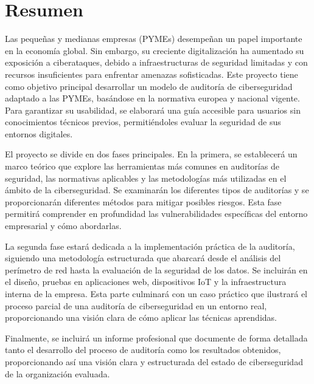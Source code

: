 \documentclass[a4paper, 10pt]{article}
\begin{document}

\section*{Resumen}
\thispagestyle{empty}
Las pequeñas y medianas empresas (PYMEs) desempeñan un papel importante en la economía global. Sin embargo, su creciente
digitalización ha aumentado su exposición a ciberataques, debido a infraestructuras de seguridad limitadas y con recursos insuficientes para enfrentar amenazas sofisticadas. 
Este proyecto tiene como objetivo principal desarrollar un modelo de auditoría de ciberseguridad adaptado a las PYMEs, basándose en la normativa europea y nacional vigente. Para garantizar su usabilidad, se elaborará una guía accesible para usuarios sin conocimientos técnicos previos, permitiéndoles evaluar la seguridad de sus entornos digitales.
\par\vspace{0.5cm}

El proyecto se divide en dos fases principales. En la primera, se establecerá un marco teórico que explore las herramientas más comunes en auditorías de seguridad, las normativas aplicables y las metodologías más utilizadas en el ámbito de la ciberseguridad. Se examinarán los diferentes tipos de auditorías y se proporcionarán diferentes métodos para mitigar posibles riesgos. Esta fase permitirá comprender en profundidad las vulnerabilidades específicas del entorno empresarial y cómo abordarlas.
\par\vspace{0.5cm}

La segunda fase estará dedicada a la implementación práctica de la auditoría, siguiendo una 
metodología estructurada que abarcará desde el análisis del perímetro de red hasta la evaluación de la seguridad de los datos. 
Se incluirán en el diseño, pruebas en aplicaciones web, dispositivos IoT y la infraestructura interna de la empresa. 
Esta parte culminará con un caso práctico que ilustrará el proceso parcial de una auditoría de ciberseguridad en un entorno real, proporcionando una visión clara de cómo aplicar las técnicas aprendidas.
\par\vspace{0.5cm}

Finalmente, se incluirá un informe profesional que documente de forma detallada tanto el desarrollo del proceso de auditoría como los resultados obtenidos, proporcionando así una visión clara y estructurada del estado de ciberseguridad de la organización evaluada.
\end{document}
